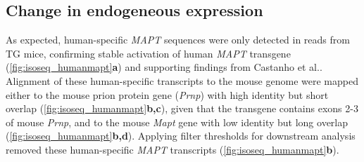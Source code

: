 \subsection{Change in endogeneous expression}
As expected, human-specific \textit{MAPT} sequences were only detected in reads from TG mice, confirming stable activation of human \textit{MAPT} transgene (\cref{fig:isoseq_humanmapt}\textbf{a}) and supporting findings from Castanho et al.\cite{Castanho2020}. Alignment of these human-specific transcripts to the mouse genome were mapped either to the mouse prion protein gene (\textit{Prnp}) with high identity but short overlap (\cref{fig:isoseq_humanmapt}\textbf{b,c}), given that the transgene contains exons 2-3 of mouse \textit{Prnp}\cite{Ramsden2005}, and to the mouse \textit{Mapt} gene with low identity but long overlap (\cref{fig:isoseq_humanmapt}\textbf{b,d}). Applying filter thresholds for downstream analysis removed these human-specific \textit{MAPT} transcripts (\cref{fig:isoseq_humanmapt}\textbf{b}). 

